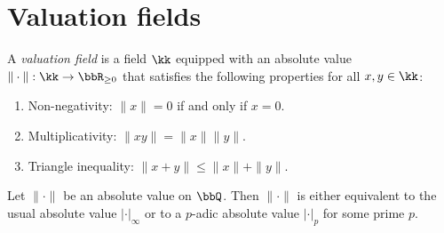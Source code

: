 \section{Valuation fields}


    \begin{definition}\label{def:valuation_field}
        A \emph{valuation field} is a field \(\kk\) equipped with an absolute value \(\|\cdot\|: \kk \to \bbR_{\ge 0}\) that satisfies the following properties for all \(x,y \in \kk\):
        \begin{enumerate}
            \item Non-negativity: \(\|x\| = 0\) if and only if \(x = 0\).
            \item Multiplicativity: \(\|xy\| = \|x\| \|y\|\).
            \item Triangle inequality: \(\|x + y\| \le \|x\| + \|y\|\).
        \end{enumerate}
    \end{definition}

    \begin{theorem}\label{thm:classification_absolute_values_Q}
        Let \(\|\cdot\|\) be an absolute value on \(\bbQ\).
        Then \(\|\cdot\|\) is either equivalent to the usual absolute value \(|\cdot|_\infty\) or to a \(p\)-adic absolute value \(|\cdot|_p\) for some prime \(p\).
    \end{theorem}